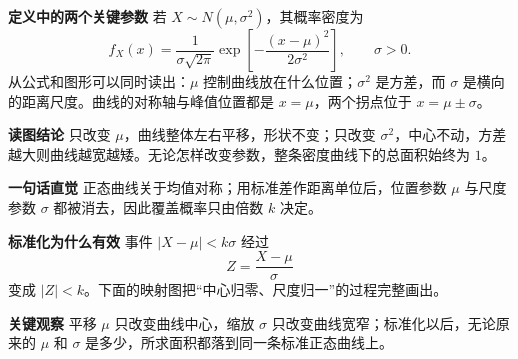 \clearpage
\begin{explanationbox}
	\textbf{\textcolor{CExplanation}{定义中的两个关键参数}}
	若 $X\sim N(\mu,\sigma^2)$，其概率密度为
	\[
		f_X(x)=\frac{1}{\sigma\sqrt{2\pi}}
		\exp\!\left[-\frac{(x-\mu)^2}{2\sigma^2}\right],
		\qquad \sigma>0.
	\]
	从公式和图形可以同时读出：$\mu$ 控制曲线放在什么位置；$\sigma^2$ 是方差，而 $\sigma$ 是横向的距离尺度。曲线的对称轴与峰值位置都是 $x=\mu$，两个拐点位于 $x=\mu\pm\sigma$。

	

	

	\textbf{\textcolor{CExplanation}{读图结论}}
	只改变 $\mu$，曲线整体左右平移，形状不变；只改变 $\sigma^2$，中心不动，方差越大则曲线越宽越矮。无论怎样改变参数，整条密度曲线下的总面积始终为 $1$。
\end{explanationbox}

\clearpage
\begin{explanationbox}
	\textbf{\textcolor{CExplanation}{一句话直觉}}
	正态曲线关于均值对称；用标准差作距离单位后，位置参数 $\mu$ 与尺度参数 $\sigma$ 都被消去，因此覆盖概率只由倍数 $k$ 决定。

	\medskip
	\textbf{\textcolor{CExplanation}{标准化为什么有效}}
	事件 $|X-\mu|<k\sigma$ 经过
	\[
		Z=\frac{X-\mu}{\sigma}
	\]
	变成 $|Z|<k$。下面的映射图把“中心归零、尺度归一”的过程完整画出。

	

	\textbf{\textcolor{CExplanation}{关键观察}}
	平移 $\mu$ 只改变曲线中心，缩放 $\sigma$ 只改变曲线宽窄；标准化以后，无论原来的 $\mu$ 和 $\sigma$ 是多少，所求面积都落到同一条标准正态曲线上。
\end{explanationbox}

